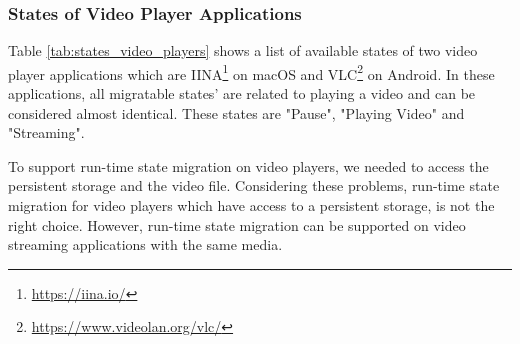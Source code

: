\subsubsection{States of Video Player Applications}
Table \ref{tab:states_video_players} shows a list of available states of two video player applications which are IINA\footnote{\url{https://iina.io/}} on macOS and VLC\footnote{\url{https://www.videolan.org/vlc/}} on Android. In these applications, all migratable states' are related to playing a video and can be considered almost identical. These states are "Pause", "Playing Video" and "Streaming". 

To support run-time state migration on video players, we needed to access the persistent storage	and the video file. Considering these problems, run-time state migration for video players which have access to a persistent storage, is not the right choice. However, run-time state migration can be supported on video streaming applications with the same media.


